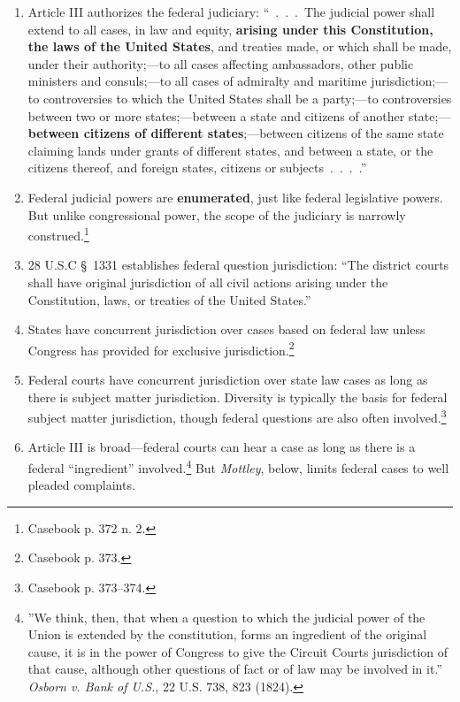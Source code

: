 \begin{enumerate}
    \item Article III authorizes the federal judiciary: ``~.~.~.~The judicial 
    power shall extend to all cases, in law and equity, \textbf{arising under 
    this Constitution, the laws of the United States}, and treaties made, or 
    which shall be made, under their authority;---to all cases affecting 
    ambassadors, other public ministers and consuls;---to all cases of 
    admiralty and maritime jurisdiction;---to controversies to which the 
    United States shall be a party;---to controversies between two or more 
    states;---between a state and citizens of another state;---\textbf{between 
    citizens of different states};---between citizens of the same state 
    claiming lands under grants of different states, and between a state, or 
    the citizens thereof, and foreign states, citizens or subjects~.~.~.~.''
    \item Federal judicial powers are \textbf{enumerated}, just like federal 
    legislative powers. But unlike congressional power, the scope of the 
    judiciary is narrowly construed.\footnote{Casebook p. 372 n.  2.}
    \item 28 U.S.C \S\ 1331 establishes federal question jurisdiction: ``The 
    district courts shall have original jurisdiction of all civil actions 
    arising under the Constitution, laws, or treaties of the United States.''
    \item States have concurrent jurisdiction over cases based on federal law 
    unless Congress has provided for exclusive jurisdiction.\footnote{Casebook 
    p. 373.}
    \item Federal courts have concurrent jurisdiction over state law cases as 
    long as there is subject matter jurisdiction. Diversity is typically the 
    basis for federal subject matter jurisdiction, though federal questions 
    are also often involved.\footnote{Casebook p. 373--374.}
    \item Article III is broad---federal courts can hear a case as long as 
    there is a federal ``ingredient'' involved.\footnote{''We think, then, 
    that when a question to which the judicial power of the Union is extended 
    by the constitution, forms an ingredient of the original cause, it is in 
    the power of Congress to give the Circuit Courts jurisdiction of that 
    cause, although other questions of fact or of law may be involved in it.'' 
    \emph{Osborn v. Bank of U.S.}, 22 U.S. 738, 823 (1824).} But 
    \emph{Mottley}, below, limits federal cases to well pleaded complaints.
\end{enumerate}

